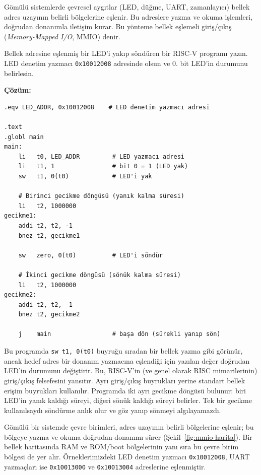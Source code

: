 Gömülü sistemlerde çevresel aygıtlar (LED, düğme, UART, zamanlayıcı) bellek adres uzayının belirli bölgelerine eşlenir. Bu adreslere yazma ve okuma işlemleri, doğrudan donanımla iletişim kurar. Bu yönteme bellek eşlemeli giriş/çıkış (\emph{Memory-Mapped I/O}, MMIO) denir.

\begin{ornek}[4.18]
\label{orn:mmio-led}
Bellek adresine eşlenmiş bir LED'i yakıp söndüren bir RISC-V programı yazın. LED denetim yazmacı \texttt{0x10012008} adresinde olsun ve 0. bit LED'in durumunu belirlesin.

\textbf{Çözüm:}

\begin{lstlisting}[style=riscv]
.eqv LED_ADDR, 0x10012008    # LED denetim yazmacı adresi

.text
.globl main
main:
    li   t0, LED_ADDR         # LED yazmacı adresi
    li   t1, 1                # bit 0 = 1 (LED yak)
    sw   t1, 0(t0)            # LED'i yak

    # Birinci gecikme döngüsü (yanık kalma süresi)
    li   t2, 1000000
gecikme1:
    addi t2, t2, -1
    bnez t2, gecikme1

    sw   zero, 0(t0)          # LED'i söndür

    # İkinci gecikme döngüsü (sönük kalma süresi)
    li   t2, 1000000
gecikme2:
    addi t2, t2, -1
    bnez t2, gecikme2

    j    main                 # başa dön (sürekli yanıp sön)
\end{lstlisting}

Bu programda \texttt{sw t1, 0(t0)} buyruğu sıradan bir bellek yazma gibi görünür, ancak hedef adres bir donanım yazmacına eşlendiği için yazılan değer doğrudan LED'in durumunu değiştirir. Bu, RISC-V'in (ve genel olarak RISC mimarilerinin) giriş/çıkış felsefesini yansıtır. Ayrı giriş/çıkış buyrukları yerine standart bellek erişim buyrukları kullanılır. Programda iki ayrı gecikme döngüsü bulunur: biri LED'in yanık kaldığı süreyi, diğeri sönük kaldığı süreyi belirler. Tek bir gecikme kullanılsaydı söndürme anlık olur ve göz yanıp sönmeyi algılayamazdı.
\end{ornek}

Gömülü bir sistemde çevre birimleri, adres uzayının belirli bölgelerine eşlenir; bu bölgeye yazma ve okuma doğrudan donanımı sürer (Şekil~\ref{fig:mmio-harita}). Bir bellek haritasında RAM ve ROM/boot bölgelerinin yanı sıra bu çevre birim bölgesi de yer alır. Örneklerimizdeki LED denetim yazmacı \texttt{0x10012008}, UART yazmaçları ise \texttt{0x10013000} ve \texttt{0x10013004} adreslerine eşlenmiştir.

